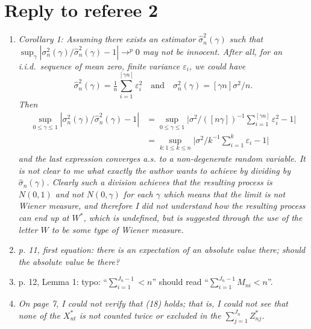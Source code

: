 \documentclass[12pt]{article}
\begin{document}
\section*{\hfill Reply to referee 2\hfill}

\begin{enumerate}
\item \textit{Corollary 1: Assuming there exists an estimator
$\hat{\sigma}_n^2(\gamma)$ such that $\sup_{\gamma}
|\sigma_n^2(\gamma)/\hat{\sigma}_n^2(\gamma) - 1| \to^p 0$ may not be
innocent. After all, for an i.i.d.\ sequence of mean zero, finite
variance $\varepsilon_i$, we could have
\[
\hat{\sigma}_{n}^2(\gamma) = \tfrac{1}{n} \sum_{i=1}^{[\gamma n]} \varepsilon_i^2
\quad\text{and}\quad
\sigma_n^2(\gamma) = [\gamma n] \sigma^2 / n.
\]
Then
\begin{align*}
\sup_{0 \leq \gamma \leq 1} | \sigma_n^2(\gamma) / \hat{\sigma}_n^2(\gamma) - 1 |
& = \sup_{0 \leq \gamma \leq 1} \Big| \sigma^2 \Big/ ([n\gamma])^{-1} \sum_{i=1}^{[\gamma n]} \varepsilon_i^2 - 1 \Big| \\
& = \sup_{k:1 \leq k \leq n} \Big| \sigma^2 \Big/ k^{-1} \sum_{i=1}^{k} \varepsilon_i - 1 \Big|
\end{align*}
and the last expression converges a.s. to a non-degenerate random
variable. It is not clear to me what exactly the author wants to
achieve by dividing by $\hat{\sigma}_n(\gamma)$. Clearly such a
division achieves that the resulting process is $N(0,1)$ and not
$N(0,\gamma)$ for each $\gamma$ which means that the limit is not
Wiener measure, and therefore I did not understand how the resulting
process can end up at $W^{*}$, which is undefined, but is suggested
through the use of the letter $W$ to be some type of Wiener measure.}

\item \textit{p. 11, first equation: there is an expectation of an
    absolute value there; should the absolute value be there?}

\item p. 12, Lemma 1: typo: ``$\sum_{i=1}^{J_n-1} < n$'' should read
  ``$\sum_{i=1}^{J_n-1} M_{ni} < n$''.

\item \textit{On page 7, I could not verify that (18) holds; that is,
    I could not see that none of the $X_{nt}^*$ is not counted twice
    or excluded in the $\sum_{j=1}^{J_n} Z_{nj}^*$.}


\end{enumerate}
\end{document}
